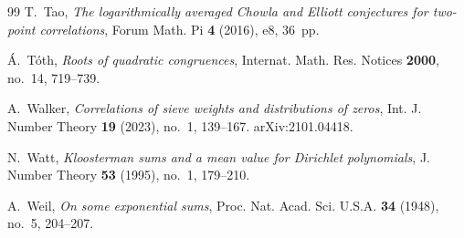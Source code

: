 \documentclass[11pt]{amsart}
\theoremstyle{definition}
\theoremstyle{remark}
\numberwithin{equation}{section}
\begin{document}
\begin{thebibliography}{99}
T.~Tao,
\emph{The logarithmically averaged Chowla and Elliott conjectures for
two-point correlations},
Forum Math. Pi \textbf{4} (2016), e8, 36~pp.

\'A.~T\'oth,
\emph{Roots of quadratic congruences},
Internat. Math. Res. Notices \textbf{2000}, no.~14, 719--739.

A.~Walker,
\emph{Correlations of sieve weights and distributions of zeros},
Int. J. Number Theory \textbf{19} (2023), no.~1, 139--167.
arXiv:2101.04418.

N.~Watt,
\emph{Kloosterman sums and a mean value for Dirichlet polynomials},
J. Number Theory \textbf{53} (1995), no.~1, 179--210.

A.~Weil,
\emph{On some exponential sums},
Proc. Nat. Acad. Sci. U.S.A. \textbf{34} (1948), no.~5, 204--207.

\end{thebibliography}
\end{document}
